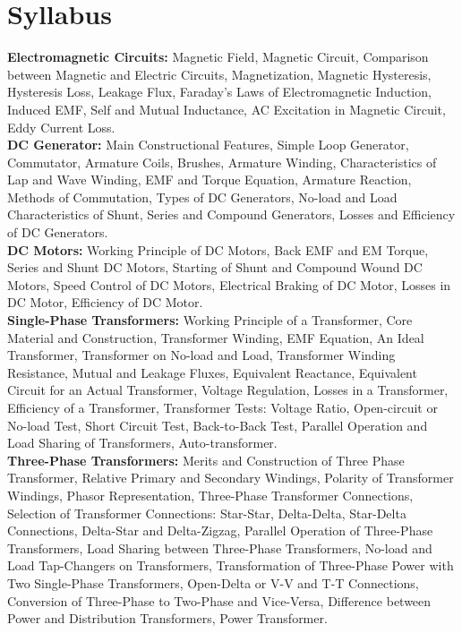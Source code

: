 \documentclass[a4aper,12pt]{report}
\begin{document}
    \chapter*{Syllabus}
    \thispagestyle{empty}
    \vspace*{-2.7cm}
    \textbf{Electromagnetic Circuits: }Magnetic Field, Magnetic Circuit, Comparison between Magnetic and Electric Circuits, Magnetization, Magnetic Hysteresis, Hysteresis Loss, Leakage Flux, Faraday’s Laws of Electromagnetic Induction, Induced EMF, Self and Mutual Inductance, AC Excitation in Magnetic Circuit, Eddy Current Loss. \\ [5pt]
    \textbf{DC Generator: }Main Constructional Features, Simple Loop Generator, Commutator, Armature Coils, Brushes, Armature Winding, Characteristics of Lap and Wave Winding, EMF and Torque Equation, Armature Reaction, Methods of Commutation, Types of DC Generators, No-load and Load Characteristics of Shunt, Series and Compound Generators, Losses and Efficiency of DC Generators. \\ [5pt]
    \textbf{DC Motors: }Working Principle of DC Motors, Back EMF and EM Torque, Series and Shunt DC Motors, Starting of Shunt and Compound Wound DC Motors, Speed Control of DC Motors, Electrical Braking of DC Motor, Losses in DC Motor, Efficiency of DC Motor. \\ [5pt]
    \textbf{Single-Phase Transformers: }Working Principle of a Transformer, Core Material and Construction, Transformer Winding, EMF Equation, An Ideal Transformer, Transformer on No-load and Load, Transformer Winding Resistance, Mutual and Leakage Fluxes, Equivalent Reactance, Equivalent Circuit for an Actual Transformer, Voltage Regulation, Losses in a Transformer, Efficiency of a Transformer, Transformer Tests: Voltage Ratio, Open-circuit or No-load Test, Short Circuit Test, Back-to-Back Test, Parallel Operation and Load Sharing of Transformers, Auto-transformer. \\ [5pt]
    \textbf{Three-Phase Transformers: }Merits and Construction of Three Phase Transformer, Relative Primary and Secondary Windings, Polarity of Transformer Windings, Phasor Representation, Three-Phase Transformer Connections, Selection of Transformer Connections: Star-Star, Delta-Delta, Star-Delta Connections, Delta-Star and Delta-Zigzag, Parallel Operation of Three-Phase Transformers, Load Sharing between Three-Phase Transformers, No-load and Load Tap-Changers on Transformers, Transformation of Three-Phase Power with Two Single-Phase Transformers, Open-Delta or V-V and T-T Connections, Conversion of Three-Phase to Two-Phase and Vice-Versa, Difference between Power and Distribution Transformers, Power Transformer.
\newpage
\end{document}

